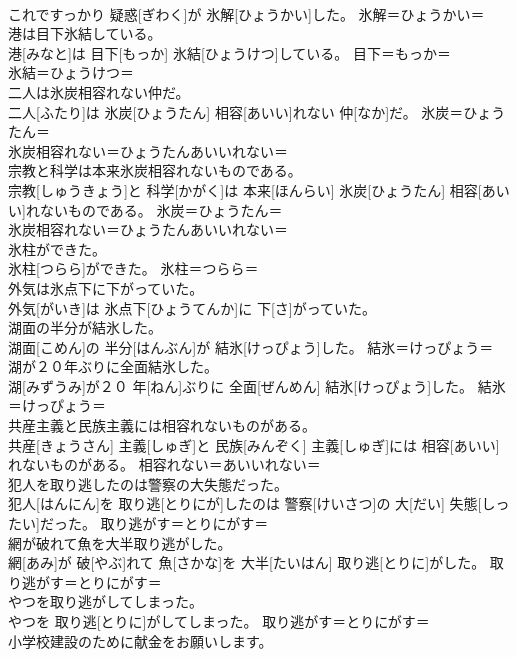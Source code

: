 \documentclass[8pt]{extreport}
\begin{document}
\begin{CJK}{UTF8}{min}
{\\	これですっかり 疑惑[ぎわく]が 氷解[ひょうかい]した。	氷解＝ひょうかい＝ 
\\	港は目下氷結している。	
\\	港[みなと]は 目下[もっか] 氷結[ひょうけつ]している。	目下＝もっか＝ 
\\	氷結＝ひょうけつ＝ 
\\	二人は氷炭相容れない仲だ。	
\\	二人[ふたり]は 氷炭[ひょうたん] 相容[あいい]れない 仲[なか]だ。	氷炭＝ひょうたん＝ 
\\	氷炭相容れない＝ひょうたんあいいれない＝ 
\\	宗教と科学は本来氷炭相容れないものである。	
\\	宗教[しゅうきょう]と 科学[かがく]は 本来[ほんらい] 氷炭[ひょうたん] 相容[あいい]れないものである。	氷炭＝ひょうたん＝ 
\\	氷炭相容れない＝ひょうたんあいいれない＝ 
\\	氷柱ができた。	
\\	氷柱[つらら]ができた。	氷柱＝つらら＝ 
\\	外気は氷点下に下がっていた。	
\\	外気[がいき]は 氷点下[ひょうてんか]に 下[さ]がっていた。	
\\	湖面の半分が結氷した。	
\\	湖面[こめん]の 半分[はんぶん]が 結氷[けっぴょう]した。	結氷＝けっぴょう＝ 
\\	湖が２０年ぶりに全面結氷した。	
\\	湖[みずうみ]が２０ 年[ねん]ぶりに 全面[ぜんめん] 結氷[けっぴょう]した。	結氷＝けっぴょう＝ 
\\	共産主義と民族主義には相容れないものがある。	
\\	共産[きょうさん] 主義[しゅぎ]と 民族[みんぞく] 主義[しゅぎ]には 相容[あいい]れないものがある。	相容れない＝あいいれない＝ 
\\	犯人を取り逃したのは警察の大失態だった。	
\\	犯人[はんにん]を 取り逃[とりにが]したのは 警察[けいさつ]の 大[だい] 失態[しったい]だった。	取り逃がす＝とりにがす＝ 
\\	網が破れて魚を大半取り逃がした。	
\\	網[あみ]が 破[やぶ]れて 魚[さかな]を 大半[たいはん] 取り逃[とりに]がした。	取り逃がす＝とりにがす＝ 
\\	やつを取り逃がしてしまった。	
\\	やつを 取り逃[とりに]がしてしまった。	取り逃がす＝とりにがす＝ 
\\	小学校建設のために献金をお願いします。	
}
\end{CJK}
\end{document}
